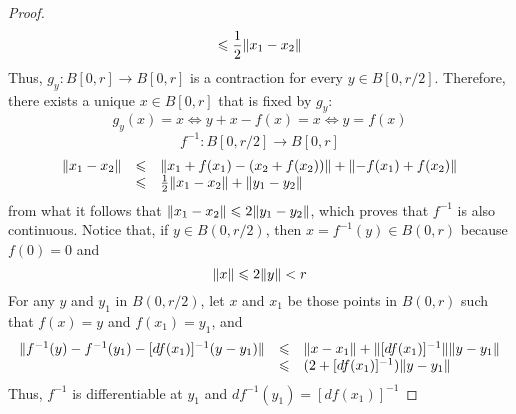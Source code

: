 \begin{proof}
\[    \leqslant
    \frac{1}{2}\lVert x_{1}-x_{2}\rVert
  \]
  Thus, \(g_{y}:{B[0,r]}\to{B[0,r]}\) is a contraction for every \({y}\in{B[0,r/2]}\). Therefore, there exists a unique \({x}\in{B[0,r]}\) that is fixed by \(g_{y}\):
  \[
    g_{y}(x)=x
    \iff
    y + x - f(x) = x
    \iff
    y = f(x)
  \]
  \[
    f^{-1}:{B[0,r/2]}\to{B[0,r]}
  \]
  \[
    \begin{array}{rcl}
      \lVert x_{1}-x_{2}\rVert
      &\leqslant&
      \lVert x_{1}+f(x_{1}) - (x_{2}+f(x_{2}))\rVert
      +
      \lVert-f(x_{1})+f(x_{2})\rVert
      \\
      &\leqslant&
      \frac{1}{2}\lVert x_{1}-x_{2}\rVert
      +
      \lVert y_{1}-y_{2}\rVert
    \end{array}
  \]
  from what it follows that \(\lVert x_{1}-x_{2}\rVert\leqslant{2\lVert y_{1}-y_{2}\rVert}\), which proves that \(f^{-1}\) is also continuous.
  Notice that, if \({y}\in{B(0,r/2)}\), then \({x=f^{-1}(y)}\in{B(0,r)}\) because \(f(0)=0\) and
  \[
    \lVert x\rVert\leqslant{2\lVert y\rVert}<r
  \]
  For any \(y\) and \(y_{1}\) in \(B(0,r/2)\), let \(x\) and \(x_{1}\) be those points in \(B(0,r)\) such that \(f(x)=y\) and \(f(x_{1})=y_{1}\), and
  \[
    \begin{array}{rcl}
      \lVert f^{-1}(y)-f^{-1}(y_{1})-[df(x_{1})]^{-1}(y-y_{1})\rVert
      &\leqslant&
      \lVert x-x_{1}\rVert
      +
      \lVert[df(x_{1})]^{-1}\rVert\lVert y-y_{1}\rVert
      \\
      &\leqslant&
      (2+[df(x_{1})]^{-1})\lVert y-y_{1}\rVert
    \end{array}
  \]
  Thus, \(f^{-1}\) is differentiable at \(y_{1}\) and \(df^{-1}(y_{1})=[df(x_{1})]^{-1}\)
\end{proof}
